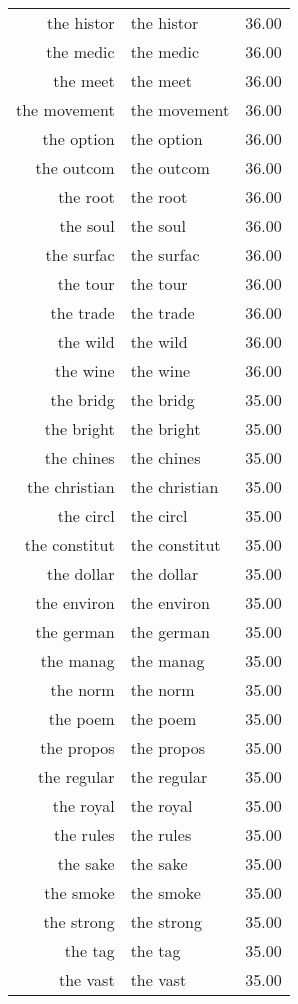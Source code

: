 \begin{table}[ht]
\begin{tabular}{rlr}
  the histor & the histor & 36.00 \\ 
  the medic & the medic & 36.00 \\ 
  the meet & the meet & 36.00 \\ 
  the movement & the movement & 36.00 \\ 
  the option & the option & 36.00 \\ 
  the outcom & the outcom & 36.00 \\ 
  the root & the root & 36.00 \\ 
  the soul & the soul & 36.00 \\ 
  the surfac & the surfac & 36.00 \\ 
  the tour & the tour & 36.00 \\ 
  the trade & the trade & 36.00 \\ 
  the wild & the wild & 36.00 \\ 
  the wine & the wine & 36.00 \\ 
  the bridg & the bridg & 35.00 \\ 
  the bright & the bright & 35.00 \\ 
  the chines & the chines & 35.00 \\ 
  the christian & the christian & 35.00 \\ 
  the circl & the circl & 35.00 \\ 
  the constitut & the constitut & 35.00 \\ 
  the dollar & the dollar & 35.00 \\ 
  the environ & the environ & 35.00 \\ 
  the german & the german & 35.00 \\ 
  the manag & the manag & 35.00 \\ 
  the norm & the norm & 35.00 \\ 
  the poem & the poem & 35.00 \\ 
  the propos & the propos & 35.00 \\ 
  the regular & the regular & 35.00 \\ 
  the royal & the royal & 35.00 \\ 
  the rules & the rules & 35.00 \\ 
  the sake & the sake & 35.00 \\ 
  the smoke & the smoke & 35.00 \\ 
  the strong & the strong & 35.00 \\ 
  the tag & the tag & 35.00 \\ 
  the vast & the vast & 35.00 \\ 

\end{tabular}
\end{table}

